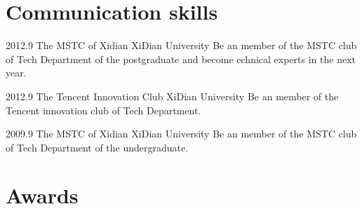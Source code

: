 \documentclass[]{friggeri-cv} %
\begin{document}
\section{Communication skills}

\begin{entrylist}
\entry
{2012.9}
{The MSTC of Xidian}
{XiDian University}
{Be an member of the MSTC club of Tech Department of the postgraduate and become echnical experts in the next year.}

\entry
{2012.9}
{The Tencent Innovation Club}
{XiDian University}
{Be an member of the Tencent innovation club of Tech Department.}

\entry
{2009.9}
{The MSTC of Xidian}
{XiDian University}
{Be an member of the MSTC club of Tech Department of the undergraduate.}

\end{entrylist}



\section{Awards}
\end{document}
